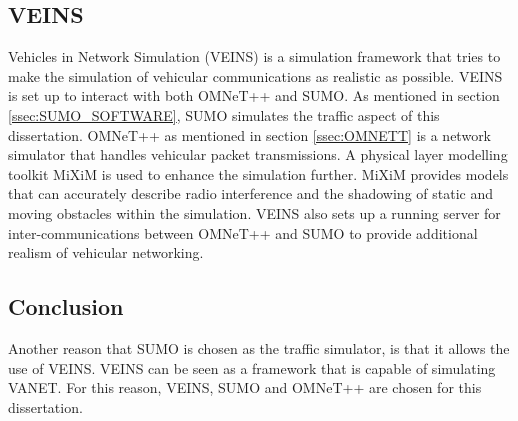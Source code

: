 \subsection{VEINS}
Vehicles in Network Simulation (VEINS) is a simulation framework that tries to make the simulation of vehicular communications as realistic as possible. VEINS is set up to interact with both OMNeT++ and SUMO. As mentioned in section \ref{ssec:SUMO_SOFTWARE}, SUMO simulates the traffic aspect of this dissertation. OMNeT++ as mentioned in section \ref{ssec:OMNETT} is a network simulator that handles vehicular packet transmissions. A physical layer modelling toolkit MiXiM is used to enhance the simulation further. MiXiM provides models that can accurately describe radio interference and the shadowing of static and moving obstacles within the simulation. VEINS also sets up a running server for inter-communications between OMNeT++ and SUMO to provide additional realism of vehicular networking.

\subsection{Conclusion}
Another reason that \ac{SUMO} is chosen as the traffic simulator, is that it allows the use of \ac{VEINS}. \ac{VEINS} can be seen as a framework that is capable of simulating \ac{VANET}. For this reason, VEINS, SUMO and OMNeT++ are chosen for this dissertation.